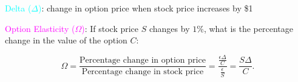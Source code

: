 \begin{frame}[fragile,t]

	\textcolor{cyan}{Delta ($\Delta$)}: change in option price when stock price increases by \$1

	\bigskip
	\mySeparateLine
	\bigskip

	\textcolor{magenta}{Option Elasticity ($\Omega$)}: If stock price $S$ changes by $1\%$, what is
	the percentage change in the value of the option $C$:

	\begin{equation*}
	 \Omega = \frac{\text{Percentage change in option price}}{\text{Percentage change in stock price}}
	 = \frac{\frac{\epsilon \Delta}{C}}{\frac{\epsilon}{S}} = \frac{S\Delta}{C}.
	\end{equation*}
\end{frame}
